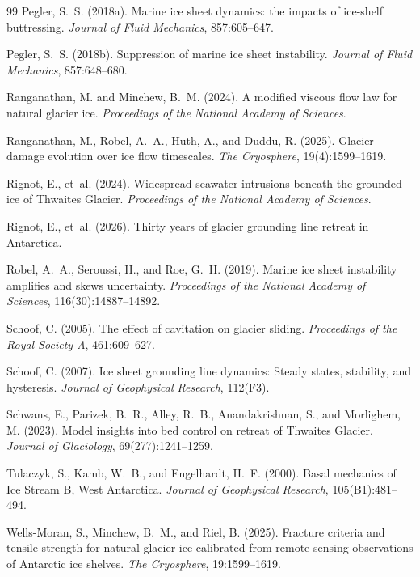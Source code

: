 \documentclass[11pt]{article}
\theoremstyle{definition}
\begin{document}
\begin{thebibliography}{99}
Pegler, S.~S. (2018a).
\newblock Marine ice sheet dynamics: the impacts of ice-shelf buttressing.
\newblock \textit{Journal of Fluid Mechanics}, 857:605--647.

Pegler, S.~S. (2018b).
\newblock Suppression of marine ice sheet instability.
\newblock \textit{Journal of Fluid Mechanics}, 857:648--680.

Ranganathan, M. and Minchew, B.~M. (2024).
\newblock A modified viscous flow law for natural glacier ice.
\newblock \textit{Proceedings of the National Academy of Sciences}.

Ranganathan, M., Robel, A.~A., Huth, A., and Duddu, R. (2025).
\newblock Glacier damage evolution over ice flow timescales.
\newblock \textit{The Cryosphere}, 19(4):1599--1619.

Rignot, E., et~al. (2024).
\newblock Widespread seawater intrusions beneath the grounded ice of {T}hwaites {G}lacier.
\newblock \textit{Proceedings of the National Academy of Sciences}.

Rignot, E., et~al. (2026).
\newblock Thirty years of glacier grounding line retreat in {A}ntarctica.

Robel, A.~A., Seroussi, H., and Roe, G.~H. (2019).
\newblock Marine ice sheet instability amplifies and skews uncertainty.
\newblock \textit{Proceedings of the National Academy of Sciences}, 116(30):14887--14892.

Schoof, C. (2005).
\newblock The effect of cavitation on glacier sliding.
\newblock \textit{Proceedings of the Royal Society A}, 461:609--627.

Schoof, C. (2007).
\newblock Ice sheet grounding line dynamics: Steady states, stability, and hysteresis.
\newblock \textit{Journal of Geophysical Research}, 112(F3).

Schwans, E., Parizek, B.~R., Alley, R.~B., Anandakrishnan, S., and Morlighem, M. (2023).
\newblock Model insights into bed control on retreat of {T}hwaites {G}lacier.
\newblock \textit{Journal of Glaciology}, 69(277):1241--1259.

Tulaczyk, S., Kamb, W.~B., and Engelhardt, H.~F. (2000).
\newblock Basal mechanics of {I}ce {S}tream {B}, {W}est {A}ntarctica.
\newblock \textit{Journal of Geophysical Research}, 105(B1):481--494.

Wells-Moran, S., Minchew, B.~M., and Riel, B. (2025).
\newblock Fracture criteria and tensile strength for natural glacier ice calibrated from remote sensing observations of {A}ntarctic ice shelves.
\newblock \textit{The Cryosphere}, 19:1599--1619.

\end{thebibliography}
\end{document}
